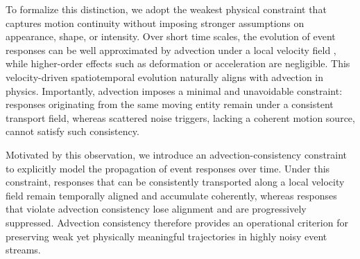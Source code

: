 \documentclass[runningheads]{llncs}
\begin{document}
To formalize this distinction, we adopt the weakest physical constraint that captures motion continuity without imposing stronger assumptions on appearance, shape, or intensity.
Over short time scales, the evolution of event responses can be well approximated by advection under a local velocity field \cite{gallego2018unifying,benosman2013event,zhu2019unsupervised}, while higher-order effects such as deformation or acceleration are negligible.
This velocity-driven spatiotemporal evolution naturally aligns with advection in physics.
Importantly, advection imposes a minimal and unavoidable constraint: responses originating from the same moving entity remain under a consistent transport field, whereas scattered noise triggers, lacking a coherent motion source, cannot satisfy such consistency.

Motivated by this observation, we introduce an advection-consistency constraint to explicitly model the propagation of event responses over time.
Under this constraint, responses that can be consistently transported along a local velocity field remain temporally aligned and accumulate coherently, whereas responses that violate advection consistency lose alignment and are progressively suppressed.
Advection consistency therefore provides an operational criterion for preserving weak yet physically meaningful trajectories in highly noisy event streams.
\end{document}
